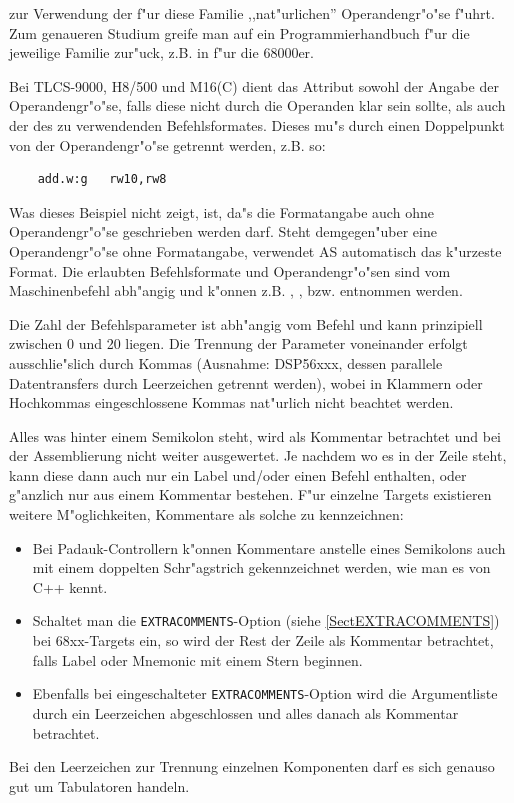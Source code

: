 \documentclass[12pt,a4paper,twoside]{report}
\newcommand{\tty}[1]{{\tt #1}}
\newcommand{\asname}{AS}
\begin{document}
zur Verwendung der f"ur diese Familie ,,nat"urlichen'' Operandengr"o"se
f"uhrt.  Zum genaueren Studium greife man auf ein Programmierhandbuch f"ur
die jeweilige Familie zur"uck, z.B. in \cite{Williams} f"ur die 68000er.
\par
Bei TLCS-9000, H8/500 und M16(C) dient das Attribut sowohl der Angabe der
Operandengr"o"se, falls diese nicht durch die Operanden klar sein sollte,
als auch der des zu verwendenden Befehlsformates.
Dieses mu"s durch einen Doppelpunkt von der Operandengr"o"se getrennt werden,
z.B. so:
\begin{verbatim}
    add.w:g   rw10,rw8
\end{verbatim}
Was dieses Beispiel nicht zeigt, ist, da"s die Formatangabe auch ohne
Operandengr"o"se geschrieben werden darf.  Steht demgegen"uber eine
Operandengr"o"se ohne Formatangabe, verwendet \asname{} automatisch das
k"urzeste Format.  Die erlaubten Befehlsformate und Operandengr"o"sen
sind vom Maschinenbefehl abh"angig und k"onnen z.B. \cite{Tosh9000},
\cite{HitH8_5}, \cite{MitM16} bzw. \cite{MitM16C} entnommen werden.
\par
Die Zahl der Befehlsparameter ist abh"angig vom Befehl und kann
prinzipiell zwischen 0 und 20 liegen.  Die Trennung der Parameter
voneinander erfolgt ausschlie"slich durch Kommas (Ausnahme: DSP56xxx,
dessen parallele Datentransfers durch Leerzeichen getrennt werden),
wobei in Klammern oder Hochkommas eingeschlossene Kommas nat"urlich
nicht beachtet werden.
\par
Alles was hinter einem Semikolon steht, wird als Kommentar betrachtet
und bei der Assemblierung nicht weiter ausgewertet.  Je nachdem
wo es in der Zeile steht, kann diese dann auch nur ein Label und/oder
einen Befehl enthalten, oder g"anzlich nur aus einem Kommentar bestehen.
F"ur einzelne Targets existieren weitere M"oglichkeiten, Kommentare als
solche zu kennzeichnen:
\begin{itemize}
\item{Bei Padauk-Controllern k"onnen Kommentare anstelle eines
      Semikolons auch mit einem doppelten Schr"agstrich gekennzeichnet
      werden, wie man es von C++ kennt.}
\item{Schaltet man die \tty{EXTRACOMMENTS}-Option (siehe \ref{SectEXTRACOMMENTS})
      bei 68xx-Targets ein, so wird der Rest der Zeile als Kommentar
      betrachtet, falls Label oder Mnemonic mit einem Stern beginnen.}
\item{Ebenfalls bei eingeschalteter \tty{EXTRACOMMENTS}-Option wird
      die Argumentliste durch ein Leerzeichen abgeschlossen und alles
      danach als Kommentar betrachtet.}
\end{itemize}
\par
Bei den Leerzeichen zur Trennung einzelnen Komponenten darf es sich
genauso gut um Tabulatoren handeln.
\end{document}
